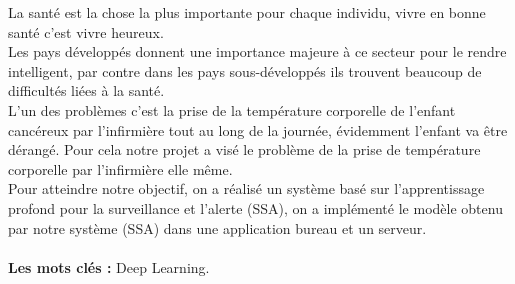 \documentclass[12pt]{article}
\begin{document}
\begin{resume}
	La sant\'e est la chose la plus importante pour chaque individu, vivre en bonne sant\' e c'est vivre heureux.\\
	Les pays d\'evelopp\'es donnent une importance majeure \`a ce secteur pour le rendre intelligent, par contre dans les pays sous-d\' evelopp\' es ils trouvent beaucoup de difficult\' es li\'ees \`a la sant\'e. \\
	
	L'un des probl\`emes c'est la prise de la temp\' erature corporelle de l'enfant canc\' ereux par l'infirmi\`ere tout au long de la journ\' ee, \' evidemment l'enfant va \^ etre d\' erang\' e. Pour cela notre projet a vis\' e le probl\`eme de la prise de temp\' erature corporelle par l'infirmi\`ere elle m\^ eme.\\

	Pour atteindre notre  objectif, on a r\' ealis\' e  un syst\` eme bas\' e sur  l'apprentissage  profond pour  la surveillance et l'alerte (SSA), on a impl\' ement\' e le mod\` ele obtenu par notre syst\` eme (SSA) dans une application bureau et un serveur.\\ \\

\textbf{Les mots cl\' es :} Deep Learning.
\end{resume}
\end{document}
